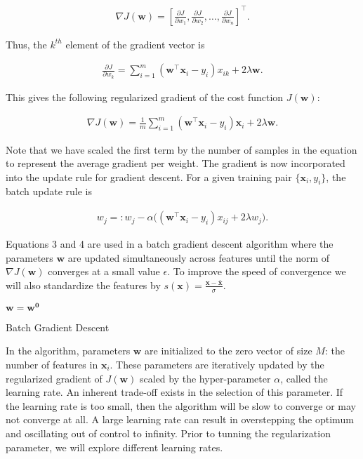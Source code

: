 \documentclass{article}
\renewcommand{\vec}[1]{\mathbf{#1}}
\begin{document}
\begin{align}
	\nabla J(\vec{w}) = \left[\frac{\partial J}{\partial w_1}, \frac{\partial J}{\partial w_2},\dots, \frac{\partial J}{\partial w_n}\right]^\top .
\end{align}

Thus, the $k^{th}$ element of the gradient vector is 

\begin{align}
\frac{\partial J}{\partial w_k} = \sum^{m}_{i=1}(\vec{w}^\top\vec{x}_i - y_i)x_{ik} + 2\lambda\vec{w}.
\end{align}


This gives the following regularized gradient of the cost function $J(\vec{w})$:

\begin{align}
	\nabla J(\vec{w}) = \frac{1}{m} \sum^{m}_{i=1}(\vec{w}^\top\vec{x}_i - y_i)\vec{x}_i + 2\lambda\vec{w}.
\end{align}

Note that we have scaled the first term by the number of samples in the equation to represent the average gradient per weight. The gradient is now incorporated into the update rule for gradient descent. For a given training pair $\{\vec{x}_i, y_i\}$, the batch update rule is

\begin{align}
w_j =: w_j - \alpha\big((\vec{w}^\top \vec{x}_i - y_i)x_{ij} + 2\lambda w_j\big).
\end{align}

Equations 3 and 4 are used in a batch gradient descent algorithm where the parameters $\vec{w}$ are updated simultaneously across features until the norm of $\nabla J(\vec{w})$ converges at a small value $\epsilon$. To improve the speed of convergence we will also standardize the features by $s(\vec{x}) = \frac{\vec{x} - \bar{\vec{x}}}{\sigma}$.

\vspace{3mm}

\begin{algorithm}[H]
	\SetAlgoLined
	$\vec{w} = \vec{w}^{\vec{0}}$\;
	\Do{$|\nabla J(\vec{w})| \ge \epsilon$}{
		$\nabla J(\vec{w}) = \frac{1}{m} \sum^{m}_{i=1}(\vec{w}^\top\vec{x}_i - y_i)\vec{x}_i + 2\lambda\vec{w}$\;
		$\vec{w} =: \vec{w} - \alpha\nabla J(\vec{w})$\;
	}
	\caption{Batch Gradient Descent}
\end{algorithm}

\vspace{3mm}

In the algorithm, parameters $\vec{w}$ are initialized to the zero vector of size $M$: the number of features in $\vec{x}_i$. These parameters are iteratively updated by the regularized gradient of $J(\vec{w})$ scaled by the hyper-parameter $\alpha$, called the learning rate. An inherent trade-off exists in the selection of this parameter. If the learning rate is too small, then the algorithm will be slow to converge or may not converge at all. A large learning rate can result in overstepping the optimum and oscillating out of control to infinity. Prior to tunning the regularization parameter, we will explore different learning rates.
\end{document}
